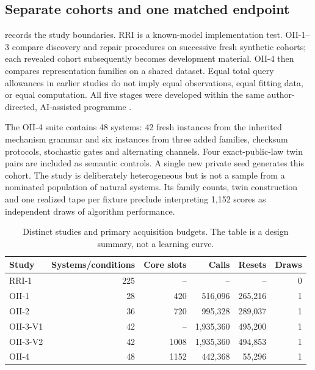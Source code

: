 \subsection{Separate cohorts and one matched endpoint}\label{p3:c18}
 records the study boundaries. RRI is a known-model implementation test. OII-1--3 compare discovery and repair procedures on successive fresh synthetic cohorts; each revealed cohort subsequently becomes development material. OII-4 then compares representation families on a shared dataset. Equal total query allowances in earlier studies do not imply equal observations, equal fitting data, or equal computation. All five stages were developed within the same author-directed, AI-assisted programme \cite{RodgersEvidence}.

The OII-4 suite contains 48 systems: 42 fresh instances from the inherited mechanism grammar and six instances from three added families, checksum protocols, stochastic gates and alternating channels. Four exact-public-law twin pairs are included as semantic controls. A single new private seed generates this cohort. The study is deliberately heterogeneous but is not a sample from a nominated population of natural systems. Its family counts, twin construction and one realized tape per fixture preclude interpreting 1,152 scores as independent draws of algorithm performance.


\begin{table}[tbp]
\centering
\caption{Distinct studies and primary acquisition budgets. The table is a design summary, not a learning curve.}\label{tab:studies}
\footnotesize
\setlength{\tabcolsep}{5pt}
\begin{tabular}{lrrrrr}
\toprule
Study & Systems/conditions & Core slots & Calls & Resets & Draws \\
\midrule
RRI-1 & 225 & -- & -- & -- & 0 \\
OII-1 & 28 & 420 & 516,096 & 265,216 & 1 \\
OII-2 & 36 & 720 & 995,328 & 289,037 & 1 \\
OII-3-V1 & 42 & -- & 1,935,360 & 495,200 & 1 \\
OII-3-V2 & 42 & 1008 & 1,935,360 & 494,853 & 1 \\
OII-4 & 48 & 1152 & 442,368 & 55,296 & 1 \\
\bottomrule
\end{tabular}
\par{}
\end{table}

